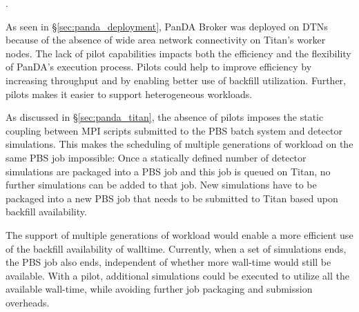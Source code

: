 
 .

As seen in \S\ref{sec:panda_deployment}, PanDA Broker was deployed on DTNs
because of the absence of wide area network connectivity on Titan's worker
nodes. The lack of pilot capabilities impacts both the efficiency and the
flexibility of PanDA's execution process. Pilots could help to improve
efficiency by increasing throughput and by enabling better use of backfill
utilization. Further, pilots makes it easier to support heterogeneous
workloads.

As discussed in \S\ref{sec:panda_titan}, the absence of pilots imposes the
static coupling between MPI scripts submitted to the PBS batch system and
detector simulations. This makes the scheduling of multiple generations of
workload on the same PBS job impossible: Once a statically defined number of
detector simulations are packaged into a PBS job and this job is queued on
Titan, no further simulations can be added to that job. New simulations have
to be packaged into a new PBS job that needs to be submitted to Titan based 
upon backfill availability.

The support of  multiple generations of workload would enable a more efficient
use of the backfill availability of walltime. Currently, when a set of
simulations ends, the PBS job also ends, independent of whether more wall-time
would still be available. With a pilot, additional simulations could be
executed  to utilize all the available wall-time, while avoiding further job
packaging and submission overheads.

